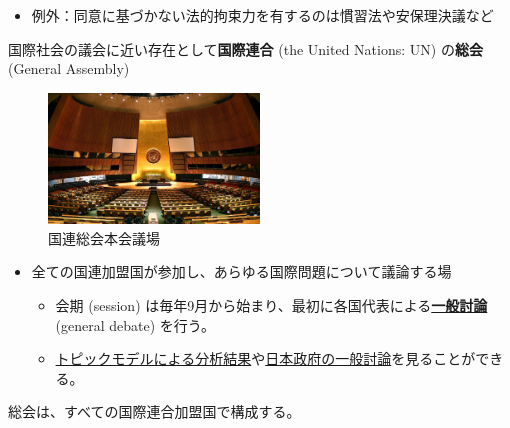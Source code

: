 \documentclass[
  xelatex,
  ja=standard]{bxjsarticle}
\providecommand{\tightlist}{%
  \setlength{\itemsep}{0pt}\setlength{\parskip}{0pt}}\usepackage{longtable,booktabs,array}
\begin{document}
\begin{itemize}
\tightlist
\item
  例外：同意に基づかない法的拘束力を有するのは慣習法や安保理決議など
\end{itemize}

国際社会の議会に近い存在として\textbf{国際連合} (the United Nations: UN)
の\textbf{総会} (General Assembly)

\begin{figure}[htpb]

{\centering \includegraphics[width=0.5\textwidth,height=\textheight]{international_society_files/mediabag/1280px-UN_General_As.jpg}

}

\caption{国連総会本会議場}

\end{figure}

\begin{itemize}
\tightlist
\item
  全ての国連加盟国が参加し、あらゆる国際問題について議論する場

  \begin{itemize}
  \tightlist
  \item
    会期 (session)
    は毎年9月から始まり、最初に各国代表による\href{https://gadebate.un.org/}{\textbf{一般討論}}
    (general debate) を行う。
  \item
    \href{http://ungd.smikhaylov.net/}{トピックモデルによる分析結果}や\href{https://www.mofa.go.jp/mofaj/gaiko/unsokai/toron.html}{日本政府の一般討論}を見ることができる。
  \end{itemize}
\end{itemize}

\begin{tcolorbox}[enhanced jigsaw, leftrule=.75mm, colback=white, bottomtitle=1mm, title=\textcolor{quarto-callout-note-color}{\faInfo}\hspace{0.5em}{\href{https://www.unic.or.jp/info/un/charter/text_japanese/}{国連憲章}　第9条1項}, breakable, coltitle=black, opacityback=0, toprule=.15mm, rightrule=.15mm, bottomrule=.15mm, titlerule=0mm, arc=.35mm, toptitle=1mm, colframe=quarto-callout-note-color-frame, opacitybacktitle=0.6, colbacktitle=quarto-callout-note-color!10!white, left=2mm]

総会は、すべての国際連合加盟国で構成する。

\end{tcolorbox}
\end{document}
